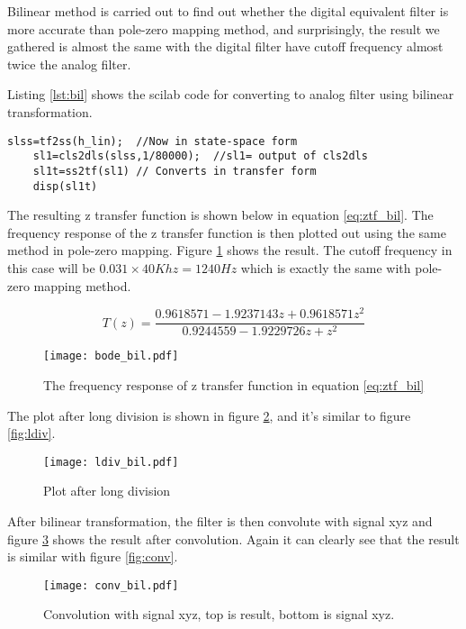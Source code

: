 \documentclass{article}
\begin{document}
Bilinear method is carried out to find out whether the digital equivalent filter is more accurate than pole-zero mapping method, and surprisingly, the result we gathered is almost the same with the digital filter have cutoff frequency almost twice the analog filter.

Listing \ref{lst:bil} shows the scilab code for converting to analog filter using bilinear transformation.
\begin{lstlisting}[linewidth=15cm, caption={scilab code for bilinear transformation}, label={lst:bil}]
    slss=tf2ss(h_lin);  //Now in state-space form
    sl1=cls2dls(slss,1/80000);  //sl1= output of cls2dls
    sl1t=ss2tf(sl1) // Converts in transfer form
    disp(sl1t)
\end{lstlisting}


The resulting z transfer function is shown below in equation \ref{eq:ztf_bil}. The frequency response of the z transfer function is then plotted out using the same method in pole-zero mapping. Figure \ref{fig:bode_bil} shows the result. The cutoff frequency in this case will be $0.031 \times 40Khz = 1240Hz$ which is exactly the same with pole-zero mapping method.

\begin{equation}
    \label{eq:ztf_bil}
    T(z) = \frac{0.9618571 - 1.9237143z + 0.9618571z^2}{0.9244559 - 1.9229726z + z^2}
\end{equation}

\begin{figure}[htpb]
    \centering
    \texttt{[image: bode\_bil.pdf]}
    \caption{The frequency response of z transfer function in equation \ref{eq:ztf_bil}}
    \label{fig:bode_bil}
\end{figure}

The plot after long division is shown in figure \ref{fig:ldiv_bil}, and it's similar to figure \ref{fig:ldiv}.

\begin{figure}[htpb]
    \centering
    \texttt{[image: ldiv\_bil.pdf]}
    \caption{Plot after long division}
    \label{fig:ldiv_bil}
\end{figure}

After bilinear transformation, the filter is then convolute with signal xyz and figure \ref{fig:conv_bil} shows the result after convolution. Again it can clearly see that the result is similar with figure \ref{fig:conv}.

\begin{figure}[htpb]
    \centering
    \texttt{[image: conv\_bil.pdf]}
    \caption{Convolution with signal xyz, top is result, bottom is signal xyz.}
    \label{fig:conv_bil}
\end{figure}
\end{document}
